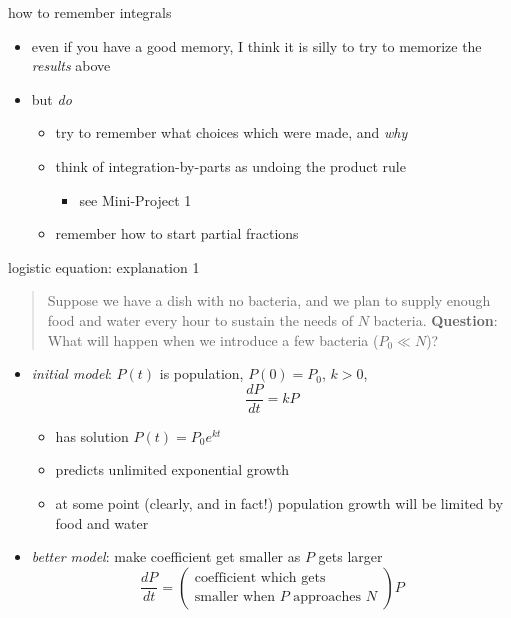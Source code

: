 \documentclass{beamer}
\begin{document}
\begin{frame}{how to remember integrals}

\begin{itemize}
\item even if you have a good memory, I think it is silly to try to memorize the \emph{results} above
\item but \emph{do}
    \begin{itemize}
    \item try to remember what choices which were made, and \emph{why}
    \item think of integration-by-parts as undoing the product rule
        \begin{itemize}
        \item see Mini-Project 1
        \end{itemize}
    \item remember how to start partial fractions
    \end{itemize}
\end{itemize}
\end{frame}


\begin{frame}{logistic equation: explanation 1}

\begin{quotation}
\noindent Suppose we have a dish with no bacteria, and we plan to supply enough food and water every hour to sustain the needs of $N$ bacteria.  \textbf{Question}: What will happen when we introduce a few bacteria ($P_0 \ll N$)?
\end{quotation}

\begin{itemize}
\item \emph{initial model}:  $P(t)$ is population, $P(0)=P_0$, $k>0$,
    $$\frac{dP}{dt} = k P$$

\vspace{-2mm}
    \begin{itemize}
    \item has solution $P(t) = P_0 e^{kt}$
    \item predicts unlimited exponential growth
    \item at some point (clearly, and in fact!) population growth will be limited by food and water
    \end{itemize}
\item \emph{better model}: make coefficient get smaller as $P$ gets larger
    $$\frac{dP}{dt} = \left(\begin{matrix} \text{coefficient which gets} \\ \text{smaller when $P$ approaches $N$}\end{matrix} \right) P$$
\end{itemize}
\end{frame}
\end{document}
